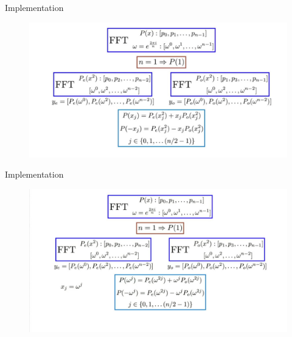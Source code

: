 \documentclass{beamer}
\begin{document}
\begin{frame}{Implementation}
       \centering
        \begin{figure}
           \centering
           \includegraphics[width=1\textwidth]{imp1.jpg}
           
           \label{fig:enter-label}
       \end{figure}
       
    \end{frame}
\begin{frame}{Implementation}
       \centering
        \begin{figure}
           \centering
           \includegraphics[width=1\textwidth]{imp2.jpg}
           
           \label{fig:enter-label}
       \end{figure}
       
    \end{frame}
\end{document}
